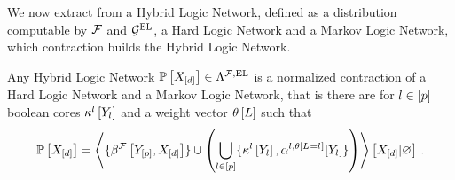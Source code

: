 We now extract from a Hybrid Logic Network, defined as a distribution computable by $\mathcal{F}$ and $\mathcal{G}^{\mathrm{EL}}$, a Hard Logic Network and a Markov Logic Network, which contraction builds the Hybrid Logic Network.

\begin{theorem}
    \label{the:hybridNetworkRepresentation}
    Any Hybrid Logic Network $\mathbb{P}\left[X_{[d]}\right]\in\Lambda^{\mathcal{F},\mathrm{EL}}$ is a normalized contraction of a Hard Logic Network and a Markov Logic Network, that is there are for $l\in[p]$ boolean cores $\kappa^{l}\left[Y_{l}\right]$ and a weight vector $\theta\left[L\right]$ such that
    \begin{align*}
        \mathbb{P}\left[X_{[d]}\right] =
        \left\langle 
            \{\beta^{\mathcal{F}}\left[Y_{[p]},X_{[d]}\right]\}
            \cup \left(\bigcup_{l\in[p]}\{\kappa^{l}\left[Y_{l}\right],\alpha^{l,\theta\left[L_{}=l_{}\right]}[Y_{l}]\}\right)
        \right\rangle \left[ X_{[d]} | \varnothing \right] \, .
    \end{align*}
\end{theorem}
